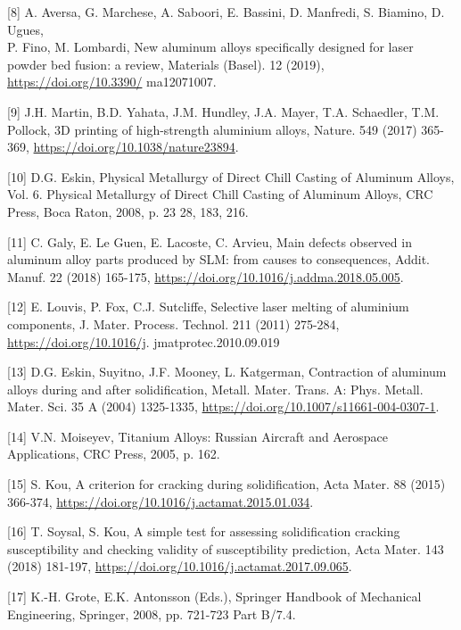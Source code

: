 \documentclass[10pt]{article}
\begin{document}
[8] A. Aversa, G. Marchese, A. Saboori, E. Bassini, D. Manfredi, S. Biamino, D. Ugues,\\
P. Fino, M. Lombardi, New aluminum alloys specifically designed for laser powder bed fusion: a review, Materials (Basel). 12 (2019), \href{https://doi.org/10.3390/}{https://doi.org/10.3390/} ma12071007.

[9] J.H. Martin, B.D. Yahata, J.M. Hundley, J.A. Mayer, T.A. Schaedler, T.M. Pollock, 3D printing of high-strength aluminium alloys, Nature. 549 (2017) 365-369, \href{https://doi.org/10.1038/nature23894}{https://doi.org/10.1038/nature23894}.

[10] D.G. Eskin, Physical Metallurgy of Direct Chill Casting of Aluminum Alloys, Vol. 6. Physical Metallurgy of Direct Chill Casting of Aluminum Alloys, CRC Press, Boca Raton, 2008, p. 23 28, 183, 216.

[11] C. Galy, E. Le Guen, E. Lacoste, C. Arvieu, Main defects observed in aluminum alloy parts produced by SLM: from causes to consequences, Addit. Manuf. 22 (2018) 165-175, \href{https://doi.org/10.1016/j.addma.2018.05.005}{https://doi.org/10.1016/j.addma.2018.05.005}.

[12] E. Louvis, P. Fox, C.J. Sutcliffe, Selective laser melting of aluminium components, J. Mater. Process. Technol. 211 (2011) 275-284, \href{https://doi.org/10.1016/j}{https://doi.org/10.1016/j}. jmatprotec.2010.09.019

[13] D.G. Eskin, Suyitno, J.F. Mooney, L. Katgerman, Contraction of aluminum alloys during and after solidification, Metall. Mater. Trans. A: Phys. Metall. Mater. Sci. 35 A (2004) 1325-1335, \href{https://doi.org/10.1007/s11661-004-0307-1}{https://doi.org/10.1007/s11661-004-0307-1}.

[14] V.N. Moiseyev, Titanium Alloys: Russian Aircraft and Aerospace Applications, CRC Press, 2005, p. 162.

[15] S. Kou, A criterion for cracking during solidification, Acta Mater. 88 (2015) 366-374, \href{https://doi.org/10.1016/j.actamat.2015.01.034}{https://doi.org/10.1016/j.actamat.2015.01.034}.

[16] T. Soysal, S. Kou, A simple test for assessing solidification cracking susceptibility and checking validity of susceptibility prediction, Acta Mater. 143 (2018) 181-197, \href{https://doi.org/10.1016/j.actamat.2017.09.065}{https://doi.org/10.1016/j.actamat.2017.09.065}.

[17] K.-H. Grote, E.K. Antonsson (Eds.), Springer Handbook of Mechanical Engineering, Springer, 2008, pp. 721-723 Part B/7.4.
\end{document}
